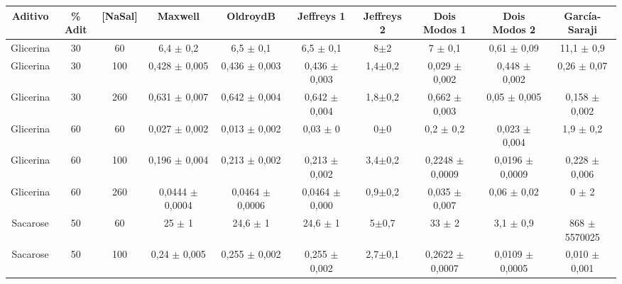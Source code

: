 	\begin{table}[h]
	\begin{adjustbox}{angle=90}
		{%
			\begin{tabular}{c c c | c c c c c c c}
				\toprule
                Aditivo  &\% Adit & [NaSal]      & Maxwell                & OldroydB                & Jeffreys 1                & Jeffreys 2    & Dois Modos 1               & Dois Modos 2                & García-Saraji \\ \midrule
				Glicerina & 30         & 60       & 6,4     \(\pm\) 0,2    & 6,5      \(\pm\) 0,1    & 6,5       \(\pm\) 0,1     & 8\(\pm\)2     & 7           \(\pm\) 0,1    & 0,61        \(\pm\) 0,09   & 11,1  \(\pm\)  0,9  \\
				Glicerina & 30         & 100      & 0,428   \(\pm\) 0,005  & 0,436    \(\pm\) 0,003  & 0,436     \(\pm\) 0,003   & 1,4\(\pm\)0,2 & 0,029       \(\pm\) 0,002  & 0,448       \(\pm\) 0,002  & 0,26  \(\pm\)  0,07  \\
				Glicerina & 30         & 260      & 0,631   \(\pm\) 0,007  & 0,642    \(\pm\) 0,004  & 0,642     \(\pm\) 0,004   & 1,8\(\pm\)0,2 & 0,662       \(\pm\) 0,003  & 0,05        \(\pm\) 0,005  & 0,158 \(\pm\)  0,002  \\
				Glicerina & 60         & 60       & 0,027   \(\pm\) 0,002  & 0,013    \(\pm\) 0,002  & 0,03      \(\pm\) 0       & 0\(\pm\)0     & 0,2         \(\pm\) 0,2    & 0,023       \(\pm\) 0,004  & 1,9   \(\pm\)   0,2  \\
				Glicerina & 60         & 100      & 0,196   \(\pm\) 0,004  & 0,213    \(\pm\) 0,002  & 0,213     \(\pm\) 0,002   & 3,4\(\pm\)0,2 & 0,2248      \(\pm\) 0,0009 & 0,0196      \(\pm\) 0,0009 & 0,228 \(\pm\)  0,006  \\
				Glicerina & 60         & 260      & 0,0444  \(\pm\) 0,0004 & 0,0464   \(\pm\) 0,0006 & 0,0464    \(\pm\) 0,000   & 0,9\(\pm\)0,2 & 0,035       \(\pm\) 0,007  & 0,06        \(\pm\) 0,02   & 0     \(\pm\)   2  \\
				Sacarose  & 50         & 60       & 25      \(\pm\) 1      & 24,6     \(\pm\) 1      & 24,6      \(\pm\) 1       & 5\(\pm\)0,7   & 33          \(\pm\) 2      & 3,1         \(\pm\) 0,9    & 868   \(\pm\)      5570025  \\
				Sacarose  & 50         & 100      & 0,24    \(\pm\) 0,005  & 0,255    \(\pm\) 0,002  & 0,255     \(\pm\) 0,002   & 2,7\(\pm\)0,1 & 0,2622      \(\pm\) 0,0007 & 0,0109      \(\pm\) 0,0005 & 0,010 \(\pm\)  0,001  \\

\end{tabular}}
\end{adjustbox}
\end{table}
